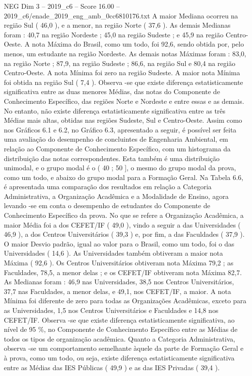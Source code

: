 \begin{textsample}{NEG Dim 3 – 2019\_c6 – Score 16.00 – 2019\_c6/enade\_2019\_eng\_amb\_0cc6810176.txt}
A maior Mediana ocorreu na região Sul ( 46,0 ), e a menor, na região Norte ( 37,6 ).
As demais Medianas foram : 40,7 na região Nordeste ; 45,0 na região Sudeste ; e 45,9 na região Centro-Oeste.
A nota Máxima do Brasil, como um todo, foi 92,6, sendo obtida por, pelo menos, um estudante na região Nordeste.
As demais notas Máximas foram : 83,0, na região Norte ; 87,9, na região Sudeste ; 86,6, na região Sul e 80,4 na região Centro-Oeste.
A nota Mínima foi zero na região Sudeste.
A maior nota Mínima foi obtida na região Sul ( 7,4 ).
Observa -se que existe diferença estatisticamente significativa entre as duas menores Médias, das notas do Componente de Conhecimento Específico, das regiões Norte e Nordeste e entre essas e as demais.
No entanto, não existe diferença estatisticamente significativa entre as três Médias mais altas, obtidas nas regiões Sudeste, Sul e Centro-Oeste.
Assim como nos Gráficos 6.1 e 6.2, no Gráfico 6.3, apresentado a seguir, é possível ser feita uma avaliação do desempenho de concluintes de Engenharia Ambiental, em relação ao Componente de Conhecimento Específico, com um histograma da distribuição das notas correspondentes.
Esta também é uma distribuição unimodal, e o grupo modal é o ( 40 ; 50 ], o mesmo do grupo modal da prova, como um todo, e abaixo do grupo modal para a Formação Geral.
Na Tabela 6.6, é apresentada uma comparação dos resultados em relação a Categoria Administrativa, a Organização Acadêmica e a Modalidade de Ensino, agora levando -se em conta o desempenho de estudantes do Componente de Conhecimento Específico da prova.
No que se refere a Organização Acadêmica, a maior Média foi a dos CEFET/IF ( 49,0 ), vindo a seguir a das Universidades ( 46,9 ), a dos Centros Universitários ( 39,3 ) e, por fim, a das Faculdades ( 37,9 ).
O maior Desvio padrão, igual ao valor para o Brasil, como um todo, foi o das Universidades ( 14,6 ).
As Universidades também obtiveram a maior nota Máxima ( 92,6 ).
Os Centros Universitários obtiveram nota Máxima 79,2 ; as Faculdades, 78,5, a menor delas ; e os CEFET/IF obtiveram nota Máxima 82,7.
As Medianas foram : 46,9 nas Universidades, 38,5 nos Centros Universitários, 37,7 nas Faculdades, a menor delas, e 49,1, nos CEFET/IF, a maior.
A nota Mínima foi diferente de zero para todas as Organizações Acadêmicas, exceto para as Universidades, 1,5 nos Centros Universitários e Faculdades e 14,8 nos CEFET/IF.
Observa -se que existe diferença estatisticamente significativa, ao nível de 95 \%, no Componente de Conhecimento Específico entre as Médias de todos os tipos de organização acadêmica.
Quanto a Categoria Administrativa, observa -se um comportamento semelhante àquele da parte de Formação Geral e à prova, como um todo, ou seja, existe diferença estatisticamente significativa entre as Médias das IES Públicas ( 49,9 ) e as das IES Privadas ( 39,4 ).

\end{textsample}
